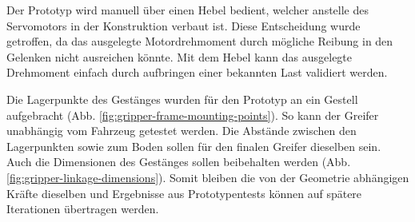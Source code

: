 Der Prototyp wird manuell über einen Hebel bedient, welcher anstelle des Servomotors in der Konstruktion verbaut ist. Diese Entscheidung wurde getroffen, da das ausgelegte Motordrehmoment durch mögliche Reibung in den Gelenken nicht ausreichen könnte. Mit dem Hebel kann das ausgelegte Drehmoment einfach durch aufbringen einer bekannten Last validiert werden.

Die Lagerpunkte des Gestänges wurden für den Prototyp an ein Gestell aufgebracht (Abb. \ref{fig:gripper-frame-mounting-points}). So kann der Greifer unabhängig vom Fahrzeug getestet werden. Die Abstände zwischen den Lagerpunkten sowie zum Boden sollen für den finalen Greifer dieselben sein. Auch die Dimensionen des Gestänges sollen beibehalten werden (Abb. \ref{fig:gripper-linkage-dimensions}). Somit bleiben die von der Geometrie abhängigen Kräfte dieselben und Ergebnisse aus Prototypentests können auf spätere Iterationen übertragen werden. 

